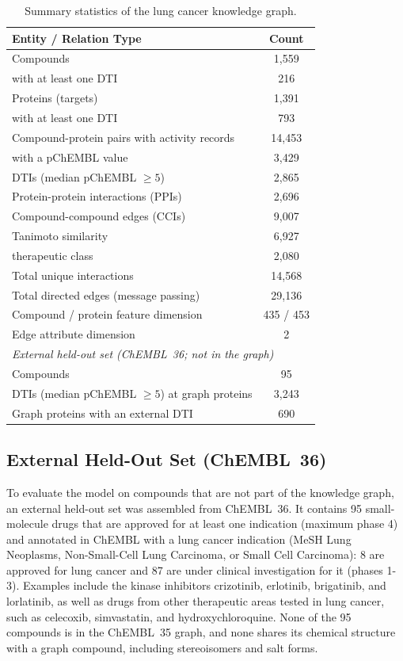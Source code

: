 \documentclass[11pt,letterpaper]{article}
\begin{document}
\begin{table}
\centering
\caption{Summary statistics of the lung cancer knowledge graph.}
\label{tab:data_stats}
\begin{tabular}{l c}
\toprule
\textbf{Entity / Relation Type} & \textbf{Count} \\
\midrule
Compounds & 1,559 \\
\quad with at least one DTI & 216 \\
Proteins (targets) & 1,391 \\
\quad with at least one DTI & 793 \\
Compound-protein pairs with activity records & 14,453 \\
\quad with a pChEMBL value & 3,429 \\
\quad DTIs (median pChEMBL $\geq 5$) & 2,865 \\
Protein-protein interactions (PPIs) & 2,696 \\
Compound-compound edges (CCIs) & 9,007 \\
\quad Tanimoto similarity & 6,927 \\
\quad therapeutic class & 2,080 \\
Total unique interactions & 14,568 \\
Total directed edges (message passing) & 29,136 \\
Compound / protein feature dimension & 435 / 453 \\
Edge attribute dimension & 2 \\
\midrule
\multicolumn{2}{l}{\textit{External held-out set (ChEMBL~36; not in the graph)}} \\
Compounds & 95 \\
DTIs (median pChEMBL $\geq 5$) at graph proteins & 3,243 \\
Graph proteins with an external DTI & 690 \\
\bottomrule
\end{tabular}
\end{table}



\subsection{External Held-Out Set (ChEMBL~36)}
\label{sec:external_set}
To evaluate the model on compounds that are not part of the knowledge graph, an external held-out set was assembled from ChEMBL~36. It contains 95 small-molecule drugs that are approved for at least one indication (maximum phase 4) and annotated in ChEMBL with a lung cancer indication (MeSH Lung Neoplasms, Non-Small-Cell Lung Carcinoma, or Small Cell Carcinoma): 8 are approved for lung cancer and 87 are under clinical investigation for it (phases 1-3). Examples include the kinase inhibitors crizotinib, erlotinib, brigatinib, and lorlatinib, as well as drugs from other therapeutic areas tested in lung cancer, such as celecoxib, simvastatin, and hydroxychloroquine. None of the 95 compounds is in the ChEMBL~35 graph, and none shares its chemical structure with a graph compound, including stereoisomers and salt forms.
\end{document}
